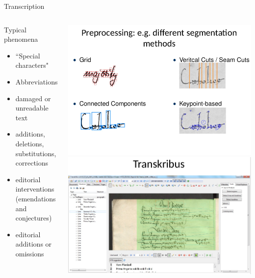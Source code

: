 \begin{frame}{Transcription}
\framebreak 

\begin{columns}
\begin{block}{Typical phenomena}
\begin{itemize}
\item “Special characters"
\item Abbreviations
\item damaged or unreadable text
\item additions, deletions, substitutions, corrections
\item editorial interventions (emendations and conjectures)
\item  editorial additions or omissions
\end{itemize}
\end{block}


\includegraphics[width=\textwidth]{img/ocr3.png}
\includegraphics[width=\textwidth]{img/ocr4-transkribus-app.png}


\end{columns}
\end{frame}
